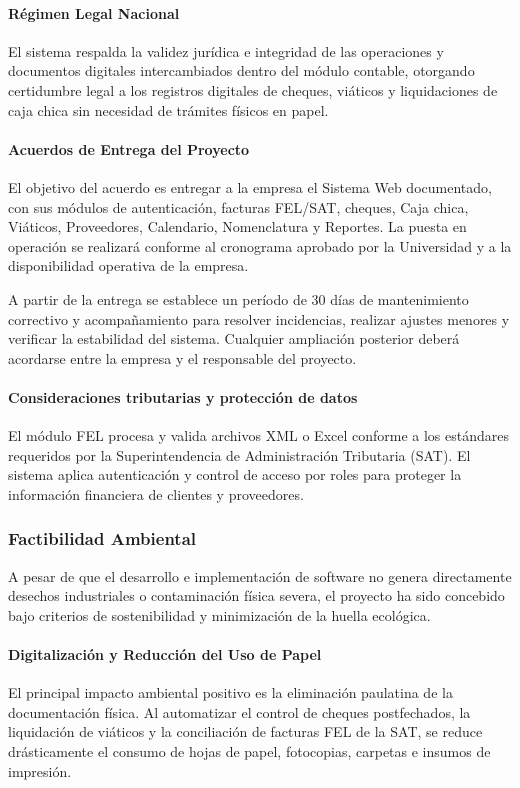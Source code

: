 \paragraph{Régimen Legal Nacional}
El sistema respalda la validez jurídica e integridad de las operaciones y documentos digitales intercambiados dentro del módulo contable, otorgando certidumbre legal a los registros digitales de cheques, viáticos y liquidaciones de caja chica sin necesidad de trámites físicos en papel.

\paragraph{Acuerdos de Entrega del Proyecto}
El objetivo del acuerdo es entregar a la empresa el Sistema Web documentado, con sus módulos de autenticación, facturas FEL/SAT, cheques, Caja chica, Viáticos, Proveedores, Calendario, Nomenclatura y Reportes. La puesta en operación se realizará conforme al cronograma aprobado por la Universidad y a la disponibilidad operativa de la empresa.

A partir de la entrega se establece un período de 30 días de mantenimiento correctivo y acompañamiento para resolver incidencias, realizar ajustes menores y verificar la estabilidad del sistema. Cualquier ampliación posterior deberá acordarse entre la empresa y el responsable del proyecto.

\paragraph{Consideraciones tributarias y protección de datos}
El módulo FEL procesa y valida archivos XML o Excel conforme a los estándares requeridos por la Superintendencia de Administración Tributaria (SAT). El sistema aplica autenticación y control de acceso por roles para proteger la información financiera de clientes y proveedores.

\subsubsection{Factibilidad Ambiental}

A pesar de que el desarrollo e implementación de software no genera directamente desechos industriales o contaminación física severa, el proyecto ha sido concebido bajo criterios de sostenibilidad y minimización de la huella ecológica.

\paragraph{Digitalización y Reducción del Uso de Papel}
El principal impacto ambiental positivo es la eliminación paulatina de la documentación física. Al automatizar el control de cheques postfechados, la liquidación de viáticos y la conciliación de facturas FEL de la SAT, se reduce drásticamente el consumo de hojas de papel, fotocopias, carpetas e insumos de impresión.

